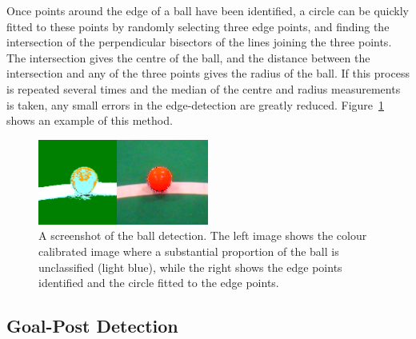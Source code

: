 \documentclass[runningheads,a4paper]{llncs}
\begin{document}

Once points around the edge of a ball have been identified, a circle can be
quickly fitted to these points by randomly selecting three edge points, and
finding the intersection of the perpendicular bisectors of the lines joining the
three points. The intersection gives the centre of the ball, and the distance
between the intersection and any of the three points gives the radius of the
ball. If this process is repeated several times and the median of the centre and
radius measurements is taken, any small errors in the edge-detection are greatly
reduced. Figure~\ref{fig:ballDetection} shows an example of this method.

\begin{figure} 
\centering
\includegraphics[width=0.5\textwidth]{figures/ballDetectionScreenshot.png}
\caption{A screenshot of the ball detection. The left image shows the colour calibrated image where a substantial proportion of the ball is unclassified (light blue), while the right shows the edge points identified and the circle fitted to the edge points.} \label{fig:ballDetection}
\end{figure}


\subsection{Goal-Post Detection}
\end{document}
